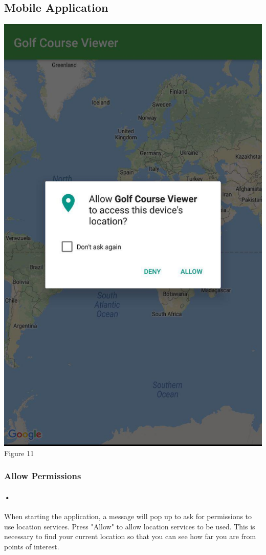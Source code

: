 \documentclass{article}
\begin{document}
	\subsection{Mobile Application}
	    \includegraphics[scale=0.2]{mobileapp-permissions.jpg}
	    \linebreak
	    Figure 11
	\subsubsection{Allow Permissions}
	
	\paragraph{•}
	When starting the application, a message will pop up to ask for permissions to use location services. Press "Allow" to allow location services to be used. This is necessary to find your current location so that you can see how far you are from points of interest.
	
\end{document}
